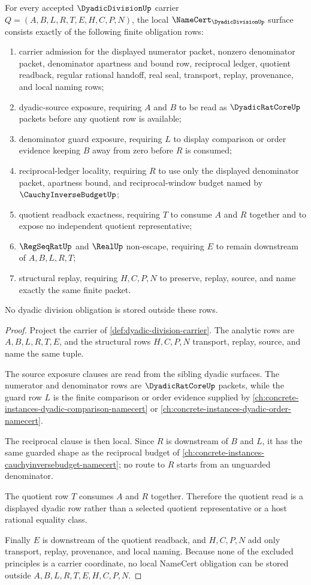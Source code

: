 \begin{theorem}
\label{thm:dyadic-division-namecert-obligations}
For every accepted $\DyadicDivisionUp$ carrier $Q=(A,B,L,R,T,E,H,C,P,N)$, the local $\NameCert_{\DyadicDivisionUp}$ surface consists exactly of the following finite obligation rows:
\begin{enumerate}
\item carrier admission for the displayed numerator packet, nonzero denominator packet, denominator apartness and bound row, reciprocal ledger, quotient readback, regular rational handoff, real seal, transport, replay, provenance, and local naming rows;
\item dyadic-source exposure, requiring $A$ and $B$ to be read as $\DyadicRatCoreUp$ packets before any quotient row is available;
\item denominator guard exposure, requiring $L$ to display comparison or order evidence keeping $B$ away from zero before $R$ is consumed;
\item reciprocal-ledger locality, requiring $R$ to use only the displayed denominator packet, apartness bound, and reciprocal-window budget named by $\CauchyInverseBudgetUp$;
\item quotient readback exactness, requiring $T$ to consume $A$ and $R$ together and to expose no independent quotient representative;
\item $\RegSeqRatUp$ and $\RealUp$ non-escape, requiring $E$ to remain downstream of $A,B,L,R,T$;
\item structural replay, requiring $H,C,P,N$ to preserve, replay, source, and name exactly the same finite packet.
\end{enumerate}
No dyadic division obligation is stored outside these rows.
\end{theorem}
\begin{proof}
Project the carrier of \autoref{def:dyadic-division-carrier}. The analytic rows are $A,B,L,R,T,E$, and the structural rows $H,C,P,N$ transport, replay, source, and name the same tuple.

The source exposure clauses are read from the sibling dyadic surfaces. The numerator and denominator rows are $\DyadicRatCoreUp$ packets, while the guard row $L$ is the finite comparison or order evidence supplied by \autoref{ch:concrete-instances-dyadic-comparison-namecert} or \autoref{ch:concrete-instances-dyadic-order-namecert}.

The reciprocal clause is then local. Since $R$ is downstream of $B$ and $L$, it has the same guarded shape as the reciprocal budget of \autoref{ch:concrete-instances-cauchyinversebudget-namecert}; no route to $R$ starts from an unguarded denominator.

The quotient row $T$ consumes $A$ and $R$ together. Therefore the quotient read is a displayed dyadic row rather than a selected quotient representative or a host rational equality class.

Finally $E$ is downstream of the quotient readback, and $H,C,P,N$ add only transport, replay, provenance, and local naming. Because none of the excluded principles is a carrier coordinate, no local NameCert obligation can be stored outside $A,B,L,R,T,E,H,C,P,N$.
\end{proof}
